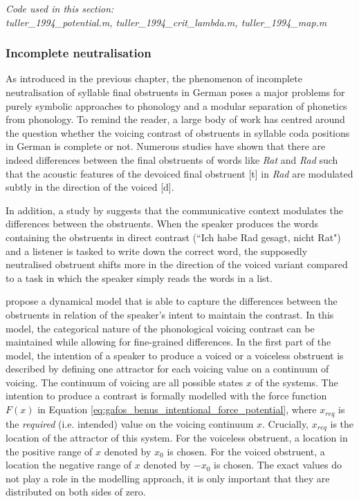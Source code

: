 \medskip\noindent \textit{Code used in this section:\\
tuller\_1994\_potential.m, tuller\_1994\_crit\_lambda.m, tuller\_1994\_map.m}


\subsubsection{Incomplete neutralisation}

As introduced in the previous chapter, the phenomenon of incomplete neutralisation of syllable final obstruents in German poses a major problems for purely symbolic approaches to phonology and a modular separation of phonetics from phonology. To remind the reader, a large body of work has centred around the question whether the voicing contrast of obstruents in syllable coda positions in German is complete or not. Numerous studies have shown that there are indeed differences between the final obstruents of words like \emph{Rat} and \emph{Rad} such that the acoustic features of the devoiced final obstruent [t] in \emph{Rad} are modulated subtly in the direction of the voiced [d].

In addition, a study by \citet{PortCrawford1989} suggests that the communicative context modulates the differences between the obstruents. When the speaker produces the words containing the obstruents in direct contrast (``Ich habe Rad gesagt, nicht Rat") and a listener is tasked to write down the correct word, the supposedly neutralised obstruent shifts more in the direction of the voiced variant compared to a task in which the speaker simply reads the words in a list.

\citet{GafosBenus2006} propose a dynamical model that is able to capture the differences between the obstruents in relation of the speaker's intent to maintain the contrast. In this model, the categorical nature of the phonological voicing contrast can be maintained while allowing for fine-grained differences. In the first part of the model, the intention of a speaker to produce a voiced or a voiceless obstruent is described by defining one attractor for each voicing value on a continuum of voicing. The continuum of voicing are all possible states $x$ of the systems. The intention to produce a contrast is formally modelled with the force function $F(x)$ in Equation \ref{eq:gafos_benus_intentional_force_potential}, where $x_{req}$ is the \emph{required} (i.e. intended) value on the voicing continuum $x$. Crucially, $x_{req}$ is the location of the attractor of this system. For the voiceless obstruent, a location in the positive range of $x$ denoted by $x_0$ is chosen. For the voiced obstruent, a location the negative range of $x$ denoted by $-x_0$ is chosen. The exact values do not play a role in the modelling approach, it is only important that they are distributed on both sides of zero.

